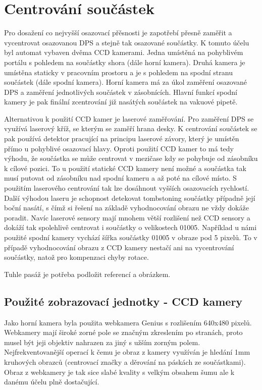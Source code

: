 \chapter{Centrování součástek}

Pro dosažení co nejvyšší osazovací přěsnosti je zapotřebí přesně zaměřit a vycentrovat osazovanou DPS a stejně tak osazované součástky. K tomuto účelu byl automat vybaven dvěma CCD kamerami. Jedna umístěná na pohyblivém portálu s pohledem na součástky shora (dále horní kamera). Druhá kamera je umístěna staticky v pracovním prostoru a je s pohledem na spodní stranu součástek (dále spodní kamera). Horní kamera má za úkol zaměření osazované DPS a zaměření jednotlivých součástek v zásobnících. Hlavní funkcí spodní kamery je pak finální zcentrování již nasátých součástek na vakuové pipetě.  

Alternativou k použití CCD kamer je laserové zaměřování. Pro zaměření DPS se využívá laserový kříž, se kterým se zaměří hrana desky. K centrování součástek se pak používá detektor pracující na principu laserové závory, který je umístěn přímo u pohyblivé osazovací hlavy. Oproti použití CCD kamer to má tedy výhodu, že součástka se může centrovat v mezičase kdy se pohybuje od zásobníku k cílové pozici. To u použití statické CCD kamery není možné a součástka tak musí putovat od zásobníku nad spodní kameru a až poté na cílové místo. S použitím laserového centrování tak lze dosáhnout vyšších osazovacích rychlostí. Další výhodou laseru je schopnost detekovat tombstoning součástky případně její boční nasátí, s čímž si řešení na základě vyhodnocování obrazu ne vždy dokáže poradit. Navíc laserové sensory mají mnohem větší rozlišení než CCD sensory a dokáží tak spolehlivě centrovat i součástky o velikostech 01005. Například u námi použité spodní kamery vychází šířka součástky 01005 v obraze pod 5 pixelů. To v případě vyhodnocování obrazu z CCD kamery nestačí ani na vycentrování součástky, natož pro kompenzaci chyby rotace. 

Tuhle pasáž je potřeba podložit referencí a obrázkem.

\section{Použité zobrazovací jednotky - CCD kamery}
Jako horní kamera byla použita webkamera Genius s rozlišením 640x480 pixelů. Webkamery mají široké zorné pole se značným zkreslením po stranách, proto musel být jeji objektiv nahrazen za jiný s užším zorným polem.  Nejfrekventovanější operací k čemu je obraz z kamery využíván je hledání 1mm kruhových obrazců (centrovací značky a děrování na páskách ze součástkami). Obraz z webkamery je tak sice slabé kvality s velkým obsahem šumu ale k danému účelu plně dostačující. 

